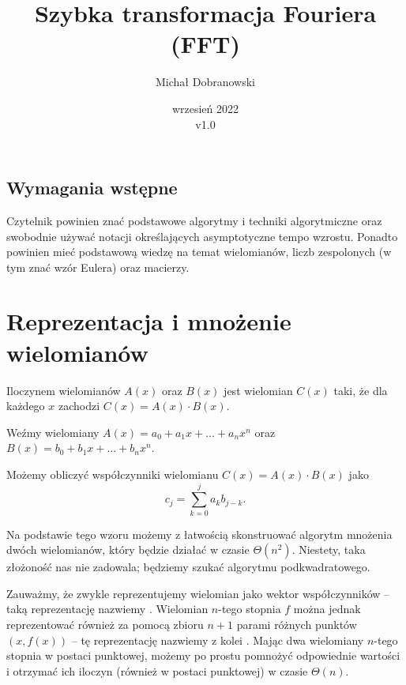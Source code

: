 \documentclass[11pt]{scrartcl}
\title{Szybka transformacja Fouriera (FFT)}
\author{Michał Dobranowski}
\date{wrzesień 2022 \\ v1.0}
\begin{document}
    \maketitle
    \subsection*{Wymagania wstępne}
    Czytelnik powinien znać podstawowe algorytmy i techniki algorytmiczne oraz swobodnie używać notacji określających asymptotyczne tempo wzrostu. Ponadto powinien mieć podstawową wiedzę na temat wielomianów, liczb zespolonych (w tym znać wzór Eulera) oraz macierzy.
    \tableofcontents
    \newpage

\section{Reprezentacja i mnożenie wielomianów}
    \begin{definition}
        Iloczynem wielomianów $A(x)$ oraz $B(x)$ jest wielomian $C(x)$ taki, że dla każdego $x$ zachodzi $C(x) = A(x)\cdot B(x)$.
    \end{definition}

    Weźmy wielomiany $A(x) = a_0 + a_1x + \ldots + a_nx^n$ oraz $B(x) = b_0 + b_1x + \ldots + b_nx^n$.
    \begin{fact}
        Możemy obliczyć współczynniki wielomianu $C(x) = A(x) \cdot B(x)$ jako
        $$ c_j = \sum_{k = 0}^j a_kb_{j-k}. $$
    \end{fact}
    Na podstawie tego wzoru możemy z łatwością skonstruować algorytm mnożenia dwóch wielomianów, który będzie działać w czasie $\Theta(n^2)$. Niestety, taka złożoność nas nie zadowala; będziemy szukać algorytmu podkwadratowego.

    Zauważmy, że zwykle reprezentujemy wielomian jako wektor współczynników -- taką reprezentację nazwiemy . Wielomian $n$-tego stopnia $f$ można jednak reprezentować również za pomocą zbioru $n + 1$ parami różnych punktów $(x, f(x))$ -- tę reprezentację nazwiemy z kolei . Mając dwa wielomiany $n$-tego stopnia w postaci punktowej, możemy po prostu pomnożyć odpowiednie wartości i otrzymać ich iloczyn (również w postaci punktowej) w czasie $\Theta(n)$.
\end{document}
